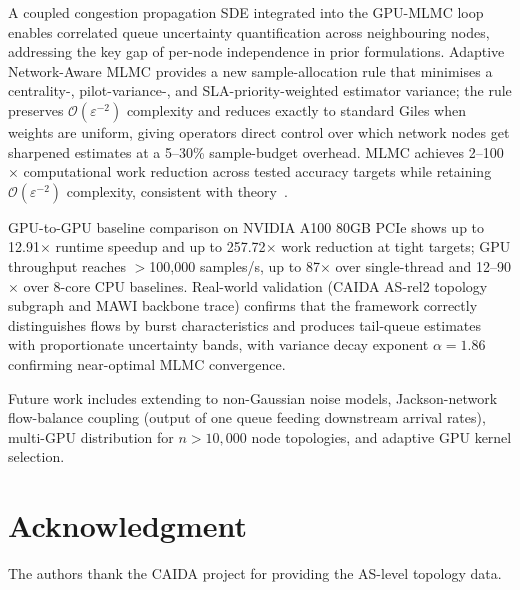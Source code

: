 \documentclass[pdflatex,sn-mathphys-num]{sn-jnl}
\theoremstyle{thmstyleone}%
\theoremstyle{thmstyletwo}%
\theoremstyle{thmstylethree}%
\begin{document}
A coupled congestion propagation SDE integrated into the GPU-MLMC loop enables correlated queue uncertainty quantification across neighbouring nodes, addressing the key gap of per-node independence in prior formulations. Adaptive Network-Aware MLMC provides a new sample-allocation rule that minimises a centrality-, pilot-variance-, and SLA-priority-weighted estimator variance; the rule preserves $\mathcal{O}(\varepsilon^{-2})$ complexity and reduces exactly to standard Giles when weights are uniform, giving operators direct control over which network nodes get sharpened estimates at a 5--30\% sample-budget overhead. MLMC achieves 2--100$\times$ computational work reduction across tested accuracy targets while retaining $\mathcal{O}(\varepsilon^{-2})$ complexity, consistent with theory~\cite{giles2015multilevel}.

GPU-to-GPU baseline comparison on NVIDIA A100 80GB PCIe shows up to 12.91$\times$ runtime speedup and up to 257.72$\times$ work reduction at tight targets; GPU throughput reaches $>$100,000 samples/s, up to 87$\times$ over single-thread and 12--90$\times$ over 8-core CPU baselines. Real-world validation (CAIDA AS-rel2 topology subgraph and MAWI backbone trace) confirms that the framework correctly distinguishes flows by burst characteristics and produces tail-queue estimates with proportionate uncertainty bands, with variance decay exponent $\alpha = 1.86$ confirming near-optimal MLMC convergence.

Future work includes extending to non-Gaussian noise models, Jackson-network flow-balance
coupling (output of one queue feeding downstream arrival rates), multi-GPU distribution for
$n > 10{,}000$ node topologies, and adaptive GPU kernel selection.

\section*{Acknowledgment}

The authors thank the CAIDA project for providing the AS-level topology data.


\end{document}
